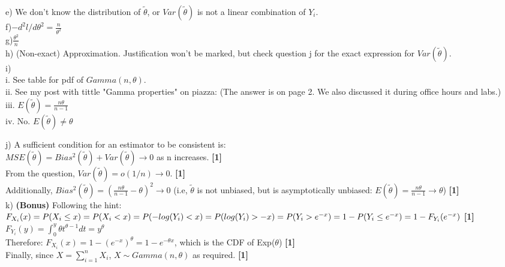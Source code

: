 \documentclass[20pt]{report}
\newcommand{\gt}{\theta}
\newcommand{\ttil}{\tilde{\theta}}
\begin{document}
e) We don't know the distribution of $\tilde{\theta} $, or 
$Var(\tilde{\theta})$ is not a linear combination of $Y_i$. \\

f)$
- d^2l/d\theta^2 = \frac{n}{\theta^2} 
$ \\

g)$
\frac{\theta^2}{n}
$ \\

h) (Non-exact) Approximation. Justification won't be marked, but check question j for the exact expression for $Var(\tilde{\theta})$. \\

i)\\ 

i. See table for pdf of $Gamma(n,\theta)$. \\

ii. See my post with tittle "Gamma properties" on piazza: (The answer is on page 2. We also discussed it during office hours and labs.)\\

iii. $E(\ttil) = \frac{n\gt}{n-1}$ \\

iv. No. $E(\ttil) \neq \theta $ \\

\pagebreak

j) A sufficient condition for an estimator to be consistent is: \\

$
MSE(\ttil) = Bias^2(\ttil) + Var(\ttil) \rightarrow 0
$ as n increases. \textbf{[1]} \\

From the question, $ Var(\ttil) = o(1/n) \rightarrow 0 $. \textbf{[1]} \\

Additionally, $ Bias^2(\ttil)= (\frac{n\gt}{n-1} - \theta)^2 \rightarrow 0 $ 
(i.e, $\ttil$ is not unbiased, but is asymptotically unbiased: $ E(\ttil) = \frac{n\gt}{n-1} \rightarrow \theta$) \textbf{[1]} \\

k) \textbf{(Bonus)} Following the hint: \\

$F_{X_i}(x) = P(X_i \leq x) = P (X_i < x) = P(-log(Y_i) < x) = P(log(Y_i) > -x) = 
P(Y_i > e^{-x}) = \\ 1 - P(Y_i \leq e^{-x}) = 1 - F_{Y_i} (e^{-x})$ \textbf{[1]} \\

$ F_{Y_i}(y) = \int_0^y \theta t^{\theta-1} dt =  y^\theta
$ \\

Therefore:
$ F_{X_i}(x) = 1 - (e^{-x}) ^\theta = 
1 - e^{-\theta x} $, which is the CDF of Exp($\theta$) \textbf{[1]} \\

Finally, since $X = \sum_{i=1}^n X_i$, $X \sim Gamma(n,\theta)$ as required. \textbf{[1]}
\end{document}
